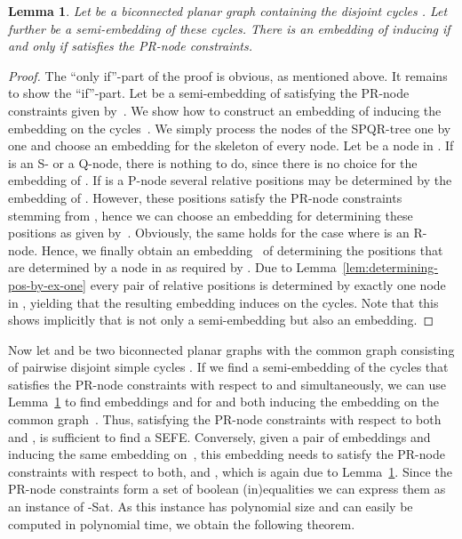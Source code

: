 \documentclass{scrartcl}
\newcommand{\1}[1]{{\normalfont \ensuremath{#1^{\tiny\circled{1}}}}} \newcommand{\2}[1]{{\normalfont \ensuremath{#1^{\tiny\circled{2}}}}} \renewcommand{\k}[1]{{\normalfont \ensuremath{#1^{\tiny\circled{k}}}}} \newcommand{\proj}[2]{\ensuremath{\left.#1\right|_{#2}}} \newcommand{\eps}{\varepsilon}
\theoremstyle{plain} \newtheorem{theorem}{Theorem} \newcounter{lemmacounter} \setcounter{lemmacounter}{0} \newtheorem{lemma}[lemmacounter]{Lemma} \newtheorem{fact}{Fact}  \newtheorem{corollary}{Corollary} \theoremstyle{definition} \newtheorem{definition}{Definition}
\begin{document}
\begin{lemma}
  \label{lem:PR-node-constraints}
  Let  be a biconnected planar graph containing the disjoint cycles
  .  Let further  be a semi-embedding of these cycles.  There is an
  embedding  of  inducing  if
  and only if  satisfies the PR-node
  constraints.
\end{lemma}
\begin{proof}
  The ``only if''-part of the proof is obvious, as mentioned above.
  It remains to show the ``if''-part.  Let 
  be a semi-embedding of  satisfying
  the PR-node constraints given by~.  We show how to construct an
  embedding  of  inducing the embedding  on the cycles~.
  We simply process the nodes of the SPQR-tree one by one and choose
  an embedding for the skeleton of every node.  Let  be a node in
  .  If  is an S- or a Q-node, there is nothing to
  do, since there is no choice for the embedding of .  If
   is a P-node several relative positions may be determined by
  the embedding of .  However, these positions satisfy the
  PR-node constraints stemming from , hence we can choose an
  embedding for  determining these positions as given
  by~.  Obviously, the same holds for the
  case where  is an R-node.  Hence, we finally obtain an
  embedding~ of  determining the positions that are
  determined by a node in  as required by .  Due to Lemma~\ref{lem:determining-pos-by-ex-one}
  every pair of relative positions is determined by exactly one node
  in , yielding that the resulting embedding 
  induces  on the cycles.  Note that this
  shows implicitly that  is not only a
  semi-embedding but also an embedding.
\end{proof}

Now let  and  be two biconnected planar graphs with the
common graph  consisting of pairwise disjoint simple cycles
.  If we find a semi-embedding
 of the cycles that satisfies the PR-node constraints with
respect to  and  simultaneously, we can use
Lemma~\ref{lem:PR-node-constraints} to find embeddings  and  for  and  both inducing the
embedding  on the common graph~.  Thus, satisfying the
PR-node constraints with respect to both  and , is
sufficient to find a {\sc SEFE}.  Conversely, given a pair of
embeddings  and  inducing the same
embedding  on~, this embedding  needs to
satisfy the PR-node constraints with respect to both,  and ,
which is again due to Lemma~\ref{lem:PR-node-constraints}.  Since the
PR-node constraints form a set of boolean (in)equalities we can
express them as an instance of {-Sat}.  As this instance has
polynomial size and can easily be computed in polynomial time, we
obtain the following theorem.
\end{document}

